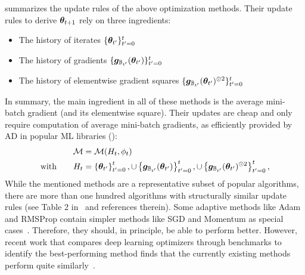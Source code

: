  summarizes the update rules
of the above optimization methods. Their update rules to derive ${\bm{\theta}}_{t+1}$
rely on three ingredients:
\begin{itemize}
\item The history of iterates $\{{\bm{\theta}}_{t'}\}_{t'=0}^{t}$
\item The history of gradients%
  $\{{\bm{g}}_{{\mathbb{B}}_{t'}}({\bm{\theta}}_{t'})\}_{t'=0}^{t}$

\item The history of elementwise gradient squares
  $\{{\bm{g}}_{{\mathbb{B}}_{t'}}({\bm{\theta}}_{t'})^{\odot 2}\}_{t'=0}^{t}$
\end{itemize}
In summary, the main ingredient in all of these methods is the average
mini-batch gradient (and its elementwise square). Their updates are cheap and
only require computation of average mini-batch gradients, as efficiently
provided by AD in popular ML libraries
():
\begin{align}\label{eq:background::PopularOptimizers}
  \begin{split}
    {\mathcal{M}}
    &=
      {\mathcal{M}}(
      H_t,
      \phi_t)
    \\
    \text{with}\qquad
    H_t
    &=
      \left\{{\bm{\theta}}_{t'}\right\}_{t'=0}^{t},
      \cup
      \left\{{\bm{g}}_{{\mathbb{B}}_{t'}}({\bm{\theta}}_{t'}) \right\}_{t'=0}^{t},
      \cup
      \left\{{\bm{g}}_{{\mathbb{B}}_{t'}}({\bm{\theta}}_{t'})^{\odot 2} \right\}_{t'=0}^{t},
  \end{split}
\end{align}
While the mentioned methods are a representative subset of popular algorithms,
there are more than one hundred algorithms with structurally similar update
rules (see Table 2 in~\cite{schmidt2021descending} and references therein). Some
adaptive methods like Adam and RMSProp contain simpler methods like SGD and
Momentum as special cases~\cite{choi2020on}. Therefore, they should, in
principle, be able to perform better. However, recent work that compares deep
learning optimizers through benchmarks to identify the best-performing method
finds that the currently existing methods perform quite
similarly~\cite{schmidt2021descending}.

